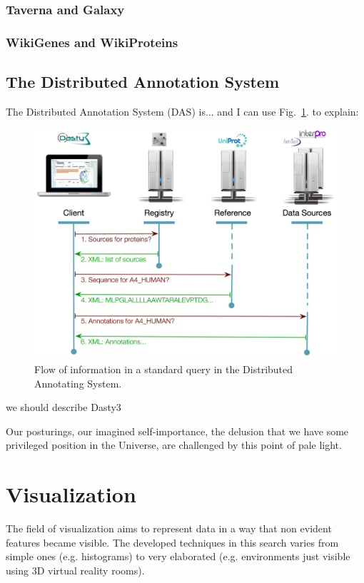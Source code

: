 \subsubsection{Taverna and Galaxy}
\subsubsection{WikiGenes and WikiProteins}

\subsection{The Distributed Annotation System}
The Distributed Annotation System (DAS) is... \cite{JEN2008} and I can use Fig.~\ref{fig:das}. to explain:
\begin{figure}  
\centering
\includegraphics[width=\textwidth]{figures/DAS.png}
\caption[DAS Flow of Information.]{Flow of information in a standard query in the Distributed Annotating System.
\label{fig:das}}
\end{figure}
we should describe Dasty3 \cite{VIL2011}

\begin{savequote}[75mm] 
Our posturings, our imagined self-importance, the delusion that we have some privileged position in the Universe, are challenged by this point of pale light.
\end{savequote}
\section{Visualization}
The field of visualization aims to represent data in a way that non evident features became visible. The developed techniques in this search varies from simple ones (e.g. histograms) to very elaborated (e.g. environments just visible using 3D virtual reality rooms).

